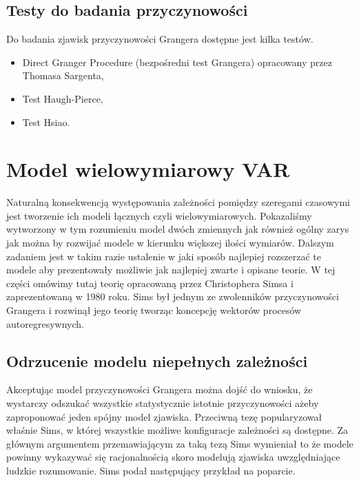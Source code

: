 \documentclass[10pt,a4paper]{book}
\begin{document}
\subsection{Testy do badania przyczynowości}

Do badania zjawisk przyczynowości Grangera dostępne jest kilka testów.

\begin{itemize}
\item Direct Granger Procedure (bezpośredni test Grangera) opracowany przez Thomasa Sargenta,
\item Test Haugh-Pierce, 
\item Test Hsiao.
\end{itemize}

\section{Model wielowymiarowy VAR}

Naturalną konsekwencją występowania zależności pomiędzy szeregami czasowymi jest tworzenie ich modeli łącznych czyli wielowymiarowych. Pokazaliśmy wytworzony w tym rozumieniu model dwóch zmiennych jak również ogólny zarys jak można by rozwijać modele w kierunku większej ilości wymiarów. Dalszym zadaniem jest w takim razie ustalenie w jaki sposób najlepiej rozszerzać te modele aby prezentowały możliwie jak najlepiej zwarte i opisane teorie. W tej części omówimy tutaj teorię opracowaną przez Christophera Simsa i zaprezentowaną w 1980 roku. Sims był jednym ze zwolenników przyczynowości Grangera i rozwinął jego teorię tworząc koncepcję wektorów procesów autoregresywnych. 

\subsection{Odrzucenie modelu niepełnych zależności}

Akceptując model przyczynowości Grangera można dojść do wniosku, że wystarczy odszukać wszystkie statystycznie istotnie przyczynowości ażeby zaproponować jeden spójny model zjawiska. Przeciwną tezę popularyzował właśnie Sims, w której wszystkie możliwe konfiguracje zależności są dostępne. Za głównym argumentem przemawiającym za taką tezą Sims wymieniał to że modele powinny wykazywać się racjonalnością skoro modelują zjawiska uwzględniające ludzkie rozumowanie. Sims podał następujący przykład na poparcie.
\end{document}
